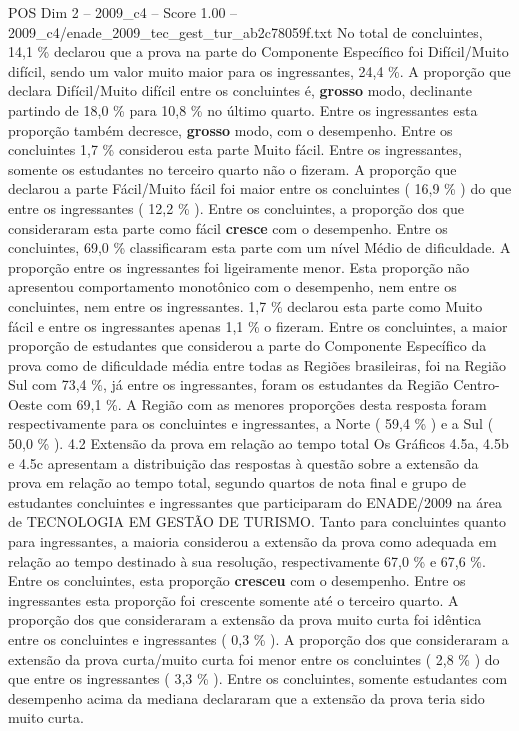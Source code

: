 \begin{textsample}{POS Dim 2 – 2009\_c4 – Score 1.00 – 2009\_c4/enade\_2009\_tec\_gest\_tur\_ab2c78059f.txt}
No total de concluintes, 14,1 \% declarou que a prova na parte do Componente Específico foi Difícil/Muito difícil, sendo um valor muito maior para os ingressantes, 24,4 \%.
A proporção que declara Difícil/Muito difícil entre os concluintes é, \textbf{grosso} modo, declinante partindo de 18,0 \% para 10,8 \% no último quarto.
Entre os ingressantes esta proporção também decresce, \textbf{grosso} modo, com o desempenho.
Entre os concluintes 1,7 \% considerou esta parte Muito fácil.
Entre os ingressantes, somente os estudantes no terceiro quarto não o fizeram.
A proporção que declarou a parte Fácil/Muito fácil foi maior entre os concluintes ( 16,9 \% ) do que entre os ingressantes ( 12,2 \% ).
Entre os concluintes, a proporção dos que consideraram esta parte como fácil \textbf{cresce} com o desempenho.
Entre os concluintes, 69,0 \% classificaram esta parte com um nível Médio de dificuldade.
A proporção entre os ingressantes foi ligeiramente menor.
Esta proporção não apresentou comportamento monotônico com o desempenho, nem entre os concluintes, nem entre os ingressantes. 1,7 \% declarou esta parte como Muito fácil e entre os ingressantes apenas 1,1 \% o fizeram.
Entre os concluintes, a maior proporção de estudantes que considerou a parte do Componente Específico da prova como de dificuldade média entre todas as Regiões brasileiras, foi na Região Sul com 73,4 \%, já entre os ingressantes, foram os estudantes da Região Centro-Oeste com 69,1 \%.
A Região com as menores proporções desta resposta foram respectivamente para os concluintes e ingressantes, a Norte ( 59,4 \% ) e a Sul ( 50,0 \% ). 4.2 Extensão da prova em relação ao tempo total Os Gráficos 4.5a, 4.5b e 4.5c apresentam a distribuição das respostas à questão sobre a extensão da prova em relação ao tempo total, segundo quartos de nota final e grupo de estudantes concluintes e ingressantes que participaram do ENADE/2009 na área de TECNOLOGIA EM GESTÃO DE TURISMO.
Tanto para concluintes quanto para ingressantes, a maioria considerou a extensão da prova como adequada em relação ao tempo destinado à sua resolução, respectivamente 67,0 \% e 67,6 \%.
Entre os concluintes, esta proporção \textbf{cresceu} com o desempenho.
Entre os ingressantes esta proporção foi crescente somente até o terceiro quarto.
A proporção dos que consideraram a extensão da prova muito curta foi idêntica entre os concluintes e ingressantes ( 0,3 \% ).
A proporção dos que consideraram a extensão da prova curta/muito curta foi menor entre os concluintes ( 2,8 \% ) do que entre os ingressantes ( 3,3 \% ).
Entre os concluintes, somente estudantes com desempenho acima da mediana declararam que a extensão da prova teria sido muito curta.

\end{textsample}

